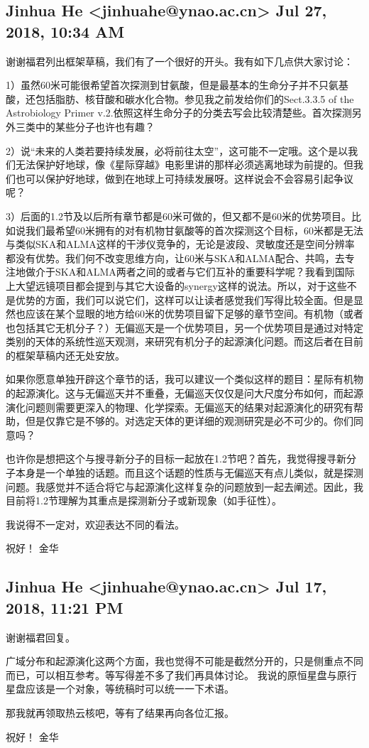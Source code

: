 \documentclass{article}
\newcommand\from[2]{\subsection{{#1} {#2}}}
\newcommand\said[1]{#1}
\begin{document}
\from{
Jinhua He <jinhuahe@ynao.ac.cn>
}{
Jul 27, 2018, 10:34 AM}
\said{
谢谢福君列出框架草稿，我们有了一个很好的开头。我有如下几点供大家讨论：

1）虽然60米可能很希望首次探测到甘氨酸，但是最基本的生命分子并不只氨基酸，还包括脂肪、核苷酸和碳水化合物。参见我之前发给你们的Sect.3.3.5 of the Astrobiology Primer v.2.依照这样生命分子的分类去写会比较清楚些。首次探测另外三类中的某些分子也许也有趣？

2）说“未来的⼈类若要持续发展，必将前往太空”，这可能不一定哦。这个是以我们无法保护好地球，像《星际穿越》电影里讲的那样必须逃离地球为前提的。但我们也可以保护好地球，做到在地球上可持续发展呀。这样说会不会容易引起争议呢？

3）后面的1.2节及以后所有章节都是60米可做的，但又都不是60米的优势项目。比如说我们最希望60米拥有的对有机物甘氨酸等的首次探测这个目标，60米都是无法与类似SKA和ALMA这样的干涉仪竞争的，无论是波段、灵敏度还是空间分辨率都没有优势。我们何不改变思维方向，让60米与SKA和ALMA配合、共鸣，去专注地做介于SKA和ALMA两者之间的或者与它们互补的重要科学呢？我看到国际上大望远镜项目都会提到与其它大设备的synergy这样的说法。所以，对于这些不是优势的方面，我们可以说它们，这样可以让读者感觉我们写得比较全面。但是显然也应该在某个显眼的地方给60米的优势项目留下足够的章节空间。有机物（或者也包括其它无机分子？）无偏巡天是一个优势项目，另一个优势项目是通过对特定类别的天体的系统性巡天观测，来研究有机分子的起源演化问题。而这后者在目前的框架草稿内还无处安放。

如果你愿意单独开辟这个章节的话，我可以建议一个类似这样的题目：星际有机物的起源演化。这与无偏巡天并不重叠，无偏巡天仅仅是问大尺度分布如何，而起源演化问题则需要更深入的物理、化学探索。无偏巡天的结果对起源演化的研究有帮助，但是仅靠它是不够的。对选定天体的更详细的观测研究是必不可少的。你们同意吗？

也许你是想把这个与搜寻新分子的目标一起放在1.2节吧？首先，我觉得搜寻新分子本身是一个单独的话题。而且这个话题的性质与无偏巡天有点儿类似，就是探测问题。我感觉并不适合将它与起源演化这样复杂的问题放到一起去阐述。因此，我目前将1.2节理解为其重点是探测新分子或新现象（如手征性）。

我说得不一定对，欢迎表达不同的看法。

祝好！
金华
}

\from{
Jinhua He <jinhuahe@ynao.ac.cn>
}{
Jul 17, 2018, 11:21 PM
}
\said{
谢谢福君回复。

广域分布和起源演化这两个方面，我也觉得不可能是截然分开的，只是侧重点不同而已，可以相互参考。等写得差不多了我们再具体讨论。
我说的原恒星盘与原行星盘应该是一个对象，等统稿时可以统一一下术语。

那我就再领取热云核吧，等有了结果再向各位汇报。

祝好！
金华
}
\end{document}
